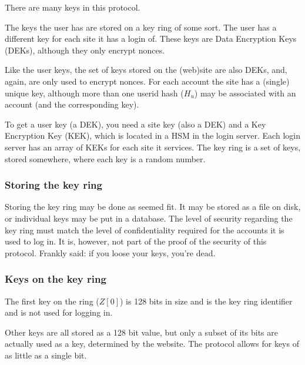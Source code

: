 There are many keys in this protocol.
\par
The keys the user has are stored on a key ring of some sort.
The user has a different key for each site it has a login of.
These keys are Data Encryption Keys (DEKs), although they only encrypt nonces.
\par
Like the user keys, the set of keys stored on the (web)site are also DEKs, and, again, are only used to encrypt nonces.
For each account the site has a (single) unique key, although more than one userid hash ($H_u$) may be associated with an account (and the corresponding key).
\par
To get a user key (a DEK), you need a site key (also a DEK) and a Key Encryption Key (KEK), which is located in a HSM in the login server.
Each login server has an array of KEKs for each site it services.
The key ring is a set of keys,
stored somewhere,
where each key is a random number.
\subsubsection{Storing the key ring}
Storing the key ring may be done as seemed fit.
It may be stored as a file on disk,
or individual keys may be put in a database.
The level of security regarding the key ring must match the level of confidentiality required for the accounts it is used to log in.
It is,
however,
not part of the proof of the security of this protocol.
Frankly said:
if you loose your keys,
you're dead.
\subsubsection{Keys on the key ring}
The first key on the ring
($Z[0]$)
is 128 bits in size and is the key ring identifier and is not used for logging in.
\par
Other keys are all stored as a 128 bit value,
but only a subset of its bits are actually used as a key,
determined by the website.
The protocol allows for keys of as little as a single bit.
